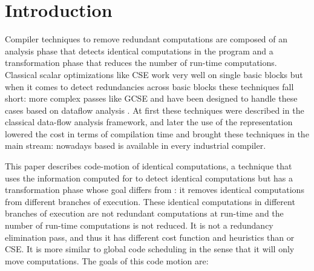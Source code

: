 \documentclass{sig-alternate}
\begin{document}
\section{Introduction}

Compiler techniques to remove redundant computations are composed of an analysis
phase that detects identical computations in the program and a transformation
phase that reduces the number of run-time computations.  Classical scalar
optimizations like CSE \cite{dragonbook} work very well on single basic blocks but
when it comes to detect redundancies across basic blocks these techniques fall
short: more complex passes like GCSE and \PRE{} have been designed to handle these
cases based on dataflow analysis \cite{morel1979global}.  At first these
techniques were described in the classical data-flow analysis framework, and
later the use of the \SSA{} representation lowered the cost in terms of compilation
time \cite{briggs1994effective,chow1997new,kennedy1999partial} and brought these
techniques in the main stream: nowadays \SSA{} based \PRE{} is available in every
industrial compiler.

This paper describes code-motion of identical computations, a technique that
uses the information computed for \PRE{} to detect identical computations but
has a transformation phase whose goal differs from \PRE{}: it removes identical
computations from different branches of execution.  These identical computations
in different branches of execution are not redundant computations at run-time
and the number of run-time computations is not reduced. It is not a redundancy
elimination pass, and thus it has different cost function and heuristics than
\PRE{} or CSE. It is more similar to global code scheduling
\cite{dragonbook,click1995global} in the sense that it will only move
computations. The goals of this code motion are:
\end{document}
